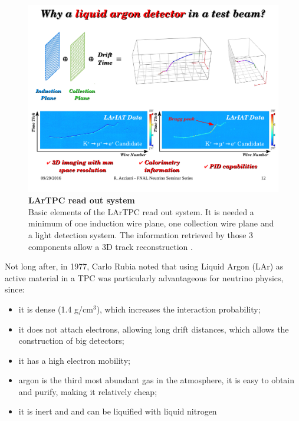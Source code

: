 \begin{figure}
	\begin{center}
		\includegraphics[scale=0.6]{Figures/Acciarri_fig2.pdf}
		\caption[LArTPC read out system]{ {\textbf{LArTPC read out system}} \\ Basic elements of the LArTPC read out system. It is needed a minimum of one induction wire plane, one collection wire plane and a light detection system. The information retrieved by those 3 components allow a 3D track reconstruction \cite{Acciarri_presentation}.}
		\label{lartpc_readout}	
	\end{center}
\end{figure}

\newpage
Not long after, in 1977, Carlo Rubia noted that using Liquid Argon (LAr) as active material in a TPC was particularly advantageous for neutrino physics, since:
\begin{itemize}
	\item it is dense (1.4 g/cm$^3$), which increases the interaction probability;
 	\item it does not attach electrons, allowing long drift distances, which allows the construction of big detectors;
  	\item it has a high electron mobility;
   	\item argon is the third most abundant gas in the atmosphere, it is easy to obtain and purify, making it relatively cheap;
  	\item it is inert and and can be liquified with liquid nitrogen \cite{Rubia_ANewConcept}
\end{itemize}

